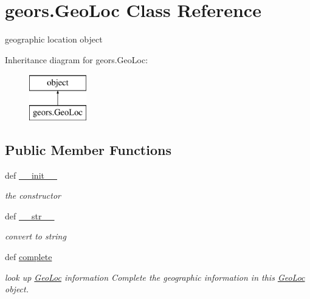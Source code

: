 \hypertarget{classgeors_1_1GeoLoc}{\section{geors.\-Geo\-Loc Class Reference}
\label{classgeors_1_1GeoLoc}
}


geographic location object  


Inheritance diagram for geors.\-Geo\-Loc\-:\begin{figure}[H]
\begin{center}
\leavevmode
\includegraphics[height=2.000000cm]{classgeors_1_1GeoLoc}
\end{center}
\end{figure}
\subsection*{Public Member Functions}
\begin{DoxyCompactItemize}
\item 
def \hyperlink{classgeors_1_1GeoLoc_aec420200a480eb3edc214ec6c25c980e}{\-\_\-\-\_\-init\-\_\-\-\_\-}
\begin{DoxyCompactList}\small\item\em the constructor \end{DoxyCompactList}\item 
\hypertarget{classgeors_1_1GeoLoc_af9fe7d2b66ce73ee115d211c99c18db0}{def \hyperlink{classgeors_1_1GeoLoc_af9fe7d2b66ce73ee115d211c99c18db0}{\-\_\-\-\_\-str\-\_\-\-\_\-}}\label{classgeors_1_1GeoLoc_af9fe7d2b66ce73ee115d211c99c18db0}

\begin{DoxyCompactList}\small\item\em convert to string \end{DoxyCompactList}\item 
def \hyperlink{classgeors_1_1GeoLoc_ad60e96d584d8aa6039ca7deb533f051e}{complete}
\begin{DoxyCompactList}\small\item\em look up \hyperlink{classgeors_1_1GeoLoc}{Geo\-Loc} information Complete the geographic information in this \hyperlink{classgeors_1_1GeoLoc}{Geo\-Loc} object. \end{DoxyCompactList}\end{DoxyCompactItemize}
